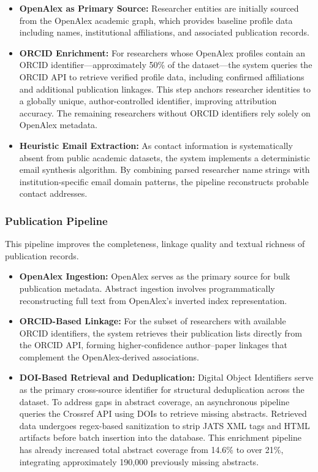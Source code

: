 \documentclass[sigconf, nonacm]{acmart}
\begin{document}
\begin{itemize}
    \item \textbf{OpenAlex as Primary Source:} Researcher entities are initially sourced from the OpenAlex academic graph, which provides baseline profile data including names, institutional affiliations, and associated publication records.

    \item \textbf{ORCID Enrichment:} For researchers whose OpenAlex profiles contain an ORCID identifier---approximately 50\% of the dataset---the system queries the ORCID API to retrieve verified profile data, including confirmed affiliations and additional publication linkages. This step anchors researcher identities to a globally unique, author-controlled identifier, improving attribution accuracy. The remaining researchers without ORCID identifiers rely solely on OpenAlex metadata.
    \item \textbf{Heuristic Email Extraction:} As contact information is systematically absent from public academic datasets, the system implements a deterministic email synthesis algorithm. By combining parsed researcher name strings with institution-specific email domain patterns, the pipeline reconstructs probable contact addresses.
\end{itemize}
\subsubsection*{Publication Pipeline}

This pipeline improves the completeness, linkage quality and textual richness of publication records.
\begin{itemize}
    \item \textbf{OpenAlex Ingestion:} OpenAlex serves as the primary source for bulk publication metadata. Abstract ingestion involves programmatically reconstructing full text from OpenAlex's inverted index representation.

    \item \textbf{ORCID-Based Linkage:} For the subset of researchers with available ORCID identifiers, the system retrieves their publication lists directly from the ORCID API, forming higher-confidence author--paper linkages that complement the OpenAlex-derived associations.

    \item \textbf{DOI-Based Retrieval and Deduplication:} Digital Object Identifiers serve as the primary cross-source identifier for structural deduplication across the dataset. To address gaps in abstract coverage, an asynchronous pipeline queries the Crossref API using DOIs to retrieve missing abstracts. Retrieved data undergoes regex-based sanitization to strip JATS XML tags and HTML artifacts before batch insertion into the database. This enrichment pipeline has already increased total abstract coverage from 14.6\% to over 21\%, integrating approximately 190,000 previously missing abstracts.
\end{itemize}
\end{document}
